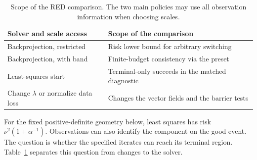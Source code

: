 \begin{table}[t]
\centering\small
\setlength{\tabcolsep}{3pt}
\begin{tabular}{@{}p{}p{}@{}}
\toprule
Solver and scale access & Scope of the comparison\\
\midrule
Backprojection, restricted & Risk lower bound for arbitrary switching\\
Backprojection, with band & Finite-budget consistency via the preset\\
Least-squares start & Terminal-only succeeds in the matched diagnostic\\
Change $\lambda$ or normalize data loss & Changes the vector fields and the barrier tests\\
\bottomrule
\end{tabular}
\caption{Scope of the RED comparison. The two main policies may
use all observation information when choosing scales.}
\label{tab:solver_scope}
\end{table}
For the fixed positive-definite geometry below, least squares
has risk $\nu^2(1+\alpha^{-1})$. Observations can also identify the
component on the good event. The question is whether the
specified iterates can reach its terminal region. Table~\ref{tab:solver_scope}
separates this question from changes to the solver.
